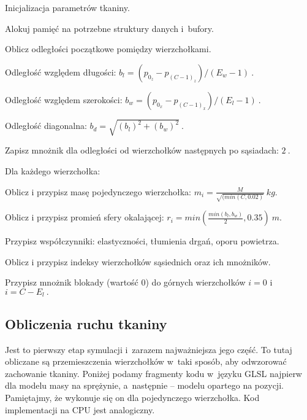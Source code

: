 		\begin{algorithm}
			\label{alg_5_4}
			\caption{Inicjalizacja parametrów tkaniny.}	
			
			Alokuj pamięć na potrzebne struktury danych i~bufory.
			
			Oblicz odległości początkowe pomiędzy wierzchołkami.
			
			\Indp
			
				Odległość względem długości: \( b_{l} = (p_{0_{z}} - p_{(C-1)_{z}}) / (E_{w} - 1) \ . \)
				
				Odległość względem szerokości: \( b_{w} = (p_{0_{x}} - p_{(C-1)_{x}}) / (E_{l} - 1) \ . \)
				
				Odległość diagonalna: \( b_{d} = \sqrt{ (b_{l})^{2} + (b_{w})^2 } \ . \)
				
				Zapisz mnożnik dla odległości od wierzchołków następnych po sąsiadach: \(2 \ .\)
			
			\Indm
			
			Dla każdego wierzchołka:
			
			\Indp
			
				Oblicz i przypisz masę pojedynczego wierzchołka: \( m_{i} = \frac{M}{\sqrt{(min(C, 0.02)}} \  kg. \)
				
				Oblicz i przypisz promień sfery okalającej: \( r_{i} = min( \frac{min(b_{l}, b_{w})}{2}, 0.35 ) \ m. \)
				
				Przypisz współczynniki: elastyczności, tłumienia drgań, oporu powietrza.
				
				Oblicz i przypisz indeksy wierzchołków sąsiednich oraz ich mnożników.
			
			\Indm
			
			Przypisz mnożnik blokady (wartość \(0\)) do górnych wierzchołków \(i = 0\) i \(i = C - E_{l} \ .\)
			
		\end{algorithm}
			
		\subsection{Obliczenia ruchu tkaniny}
		\label{t:symulacja:dzialanie:ruch}
			
		
		Jest to pierwszy etap symulacji i~zarazem najważniejsza jego część. To tutaj obliczane są przemieszczenia wierzchołków w~taki sposób, aby odwzorować zachowanie tkaniny. Poniżej podamy fragmenty kodu w~języku GLSL najpierw dla modelu masy na sprężynie, a~następnie -- modelu opartego na pozycji. Pamiętajmy, że wykonuje się on dla pojedynczego wierzchołka. Kod implementacji na CPU jest analogiczny.
		\newpage	
		
